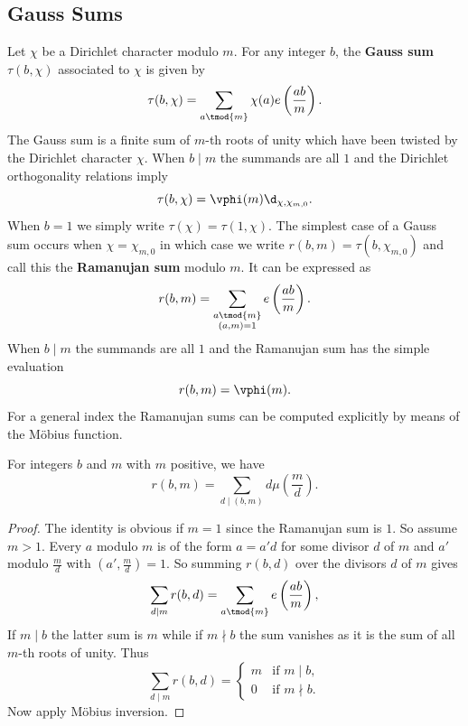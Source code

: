\documentclass[12pt]{article}
\begin{document}
    \subsection{Gauss Sums}
      Let \(\chi\) be a Dirichlet character modulo \(m\). For any integer \(b\), the \textbf{Gauss sum} \(\tau(b,\chi)\) associated to \(\chi\) is given by
      \[
        \tau(b,\chi) = \sum_{a \tmod{m}}\chi(a)e\left(\frac{ab}{m}\right).
      \]
      The Gauss sum is a finite sum of \(m\)-th roots of unity which have been twisted by the Dirichlet character \(\chi\). When \(b \mid m\) the summands are all \(1\) and the Dirichlet orthogonality relations imply
      \[
        \tau(b,\chi) = \vphi(m)\d_{\chi,\chi_{m,0}}.
      \]
      When \(b = 1\) we simply write \(\tau(\chi) = \tau(1,\chi)\). The simplest case of a Gauss sum occurs when \(\chi = \chi_{m,0}\) in which case we write \(r(b,m) = \tau(b,\chi_{m,0})\) and call this the \textbf{Ramanujan sum} modulo \(m\). It can be expressed as
      \[
        r(b,m) = \sum_{\substack{a \tmod{m} \\ (a,m) = 1}}e\left(\frac{ab}{m}\right).
      \]
      When \(b \mid m\) the summands are all \(1\) and the Ramanujan sum has the simple evaluation
      \[
        r(b,m) = \vphi(m).
      \]
      For a general index the Ramanujan sums can be computed explicitly by means of the M\"obius function.

      \begin{proposition}\label{prop:Ramanujan_sum_evaluation}
        For integers \(b\) and \(m\) with \(m\) positive, we have
        \[
          r(b,m) = \sum_{d \mid (b,m)}d\mu\left(\frac{m}{d}\right).
        \]
      \end{proposition}
      \begin{proof}
        The identity is obvious if \(m = 1\) since the Ramanujan sum is \(1\). So assume \(m > 1\). Every \(a\) modulo \(m\) is of the form \(a = a'd\) for some divisor \(d\) of \(m\) and \(a'\) modulo \(\frac{m}{d}\) with \(\left(a',\frac{m}{d}\right) = 1\). So summing \(r(b,d)\) over the divisors \(d\) of \(m\) gives
        \[
          \sum_{d \mid m}r(b,d) = \sum_{a \tmod{m}}e\left(\frac{ab}{m}\right),
        \]
        If \(m \mid b\) the latter sum is \(m\) while if \(m \nmid b\) the sum vanishes as it is the sum of all \(m\)-th roots of unity. Thus
        \[
          \sum_{d \mid m}r(b,d) = \begin{cases} m & \text{if \(m \mid b\)}, \\ 0 & \text{if \(m \nmid b\)}. \end{cases}
        \]
        Now apply M\"obius inversion.
      \end{proof}
\end{document}
